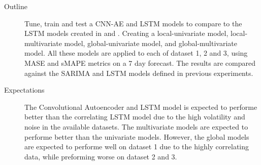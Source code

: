 \begin{description}
  \item[Outline]{
              Tune, train and test a CNN-AE and LSTM models to compare to the LSTM models
              created in  and .
              Creating a local-univariate model, local-multivariate model, global-univariate model, and global-multivariate model.
              All these models are applied to each of dataset 1, 2 and 3, using MASE and sMAPE metrics on a 7 day forecast.
              The results are compared against the SARIMA and LSTM models defined in previous experiments.
        }
\end{description}

\begin{description}
  \item[Expectations]{
              The Convolutional Autoencoder and LSTM model is expected to performe better than the correlating LSTM model
              due to the high volatility and noise in the available datasets.
              The multivariate models are expected to performe better than the univariate models.
              However, the global models are expected to performe well on dataset 1 due to the highly correlating data,
              while preforming worse on dataset 2 and 3.
        }
\end{description}